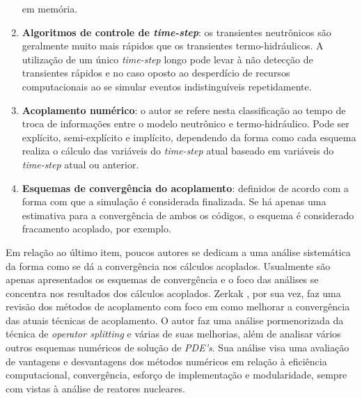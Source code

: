 \begin{enumerate}
em memória. 
\item \textbf{Algoritmos de controle de \textit{time-step}}: os transientes neutrônicos são geralmente muito mais rápidos que 
os transientes termo-hidráulicos. A utilização de um único \textit{time-step} longo pode levar à não detecção de transientes 
rápidos e no caso oposto ao desperdício de recursos computacionais ao se simular eventos indistinguíveis repetidamente.
\item \textbf{Acoplamento numérico}: o autor se refere nesta classificação ao tempo de troca de informações entre o modelo 
neutrônico e termo-hidráulico. Pode ser explícito, semi-explícito e implícito, dependendo da forma como cada esquema 
realiza o cálculo das variáveis do \textit{time-step} atual baseado em variáveis do \textit{time-step} atual ou 
anterior.
\item \textbf{Esquemas de convergência do acoplamento}: definidos de acordo com a forma com que a simulação é considerada 
finalizada. Se há apenas uma estimativa para a convergência de ambos os códigos, o esquema é considerado fracamento 
acoplado, por exemplo.  
\end{enumerate}

Em relação ao último item, poucos autores se dedicam a uma análise sistemática da forma como se
dá a convergência nos cálculos acoplados. Usualmente são apenas apresentados os esquemas
de convergência e o foco das análises se concentra nos resultados dos cálculos acoplados.
Zerkak \cite{Zerkak2015}, por sua vez, faz uma revisão dos métodos de acoplamento com
foco em como melhorar a convergência das atuais técnicas de acoplamento. O autor faz uma
análise pormenorizada da técnica de \textit{operator splitting} e várias de suas melhorias,
além de analisar vários outros esquemas numéricos de solução de \textit{PDE's}. Sua análise visa
uma avaliação de vantagens e desvantagens dos métodos numéricos em relação à eficiência
computacional, convergência, esforço de implementação e modularidade, sempre com vistas
à análise de reatores nucleares.

